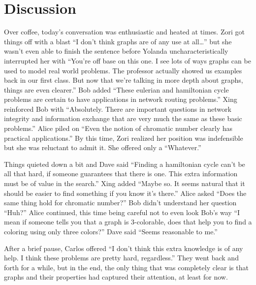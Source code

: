 \section{Discussion}

Over coffee, today's conversation was enthusiastic and heated at
times. Zori got things off with a blast ``I don't think graphs
are of any use at all\dots'' but she wasn't even able to finish
the sentence before Yolanda  uncharacteristically interrupted her with
``You're off base on this one.  I see lots of ways graphs can
be used to model real world problems.  The professor actually
showed us examples back in our first class.  But now that we're
talking in more depth about graphs, things are even clearer.''
Bob added ``These eulerian and hamiltonian cycle problems are
certain to have applications in network routing problems.''
Xing reinforced Bob with ``Absolutely.  There are important
questions in network integrity and information exchange that
are very much the same as these basic problems.'' Alice piled
on ``Even the notion of chromatic number clearly has practical
applications.''  By this time, Zori realized her position was
indefensible but she was reluctant to admit it.  She offered
only a ``Whatever.''

Things quieted down a bit and Dave said ``Finding a hamiltonian
cycle can't be all that hard, if someone guarantees that there
is one.  This extra information must be of value in the search.''
Xing added ``Maybe so.  It seems natural that it should be
easier to find something if you know it's there.''  Alice
asked ``Does the same thing hold for chromatic number?''  Bob
didn't understand her question ``Huh?''  Alice continued,
this time being careful not to even look Bob's way ``I mean
if someone tells you that a graph is $3$-colorable, does that
help you to find a coloring using only three colors?''  Dave
said ``Seems reasonable to me.''

After a brief pause, Carlos offered ``I don't think this extra
knowledge is of any help. I think these problems are pretty hard,
regardless.''  They went back and forth for a while, but in the
end, the only thing that was completely clear is that graphs
and their properties had captured their attention, at least for
now.

